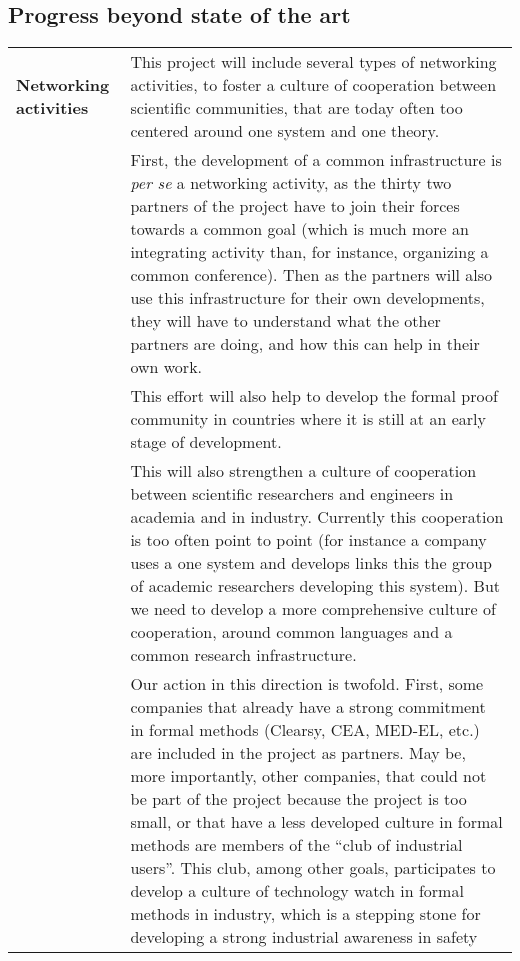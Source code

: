 \subsection{Progress beyond state of the art}


\begin{longtable}{|p{}|p{}|}
\hline
{\bf Networking activities}
&
This project will include several types of networking activities, to
foster a culture of cooperation between scientific communities, that
are today often too centered around one system and one theory.\\
&
\hspace{0.4cm} First, the development of a common infrastructure is
\emph{per se} a networking activity, as the thirty two partners of the
project have to join their forces towards a common goal (which is much
more an integrating activity than, for instance, organizing a common
conference). Then as the partners will also use this infrastructure
for their own developments, they will have to understand what the
other partners are doing, and how this can help in their own work.\\ &
\hspace{0.4cm}
This effort will also help to develop the formal proof community in
countries where it is still at an early stage of development.\\
&
\hspace{0.4cm}
This will also strengthen a culture of cooperation between scientific
researchers and engineers in academia and in industry. Currently this
cooperation is too often point to point (for instance a company uses a
one system and develops links this the group of academic researchers
developing this system). But we need to develop a more comprehensive
culture of cooperation, around common languages and a common research
infrastructure.\\
&
\hspace{0.4cm}
Our action in this direction is twofold. First, some companies that
already have a strong commitment in formal methods (Clearsy, CEA,
MED-EL, etc.) are included in the project as partners. May be, more
importantly, other companies, that could not be part of the project
because the project is too small, or that have a less developed
culture in formal methods are members of the ``club of industrial
users''. This club, among other goals, participates to develop a
culture of technology watch in formal methods in industry, which is a
stepping stone for developing a strong industrial awareness in safety

\end{longtable}
